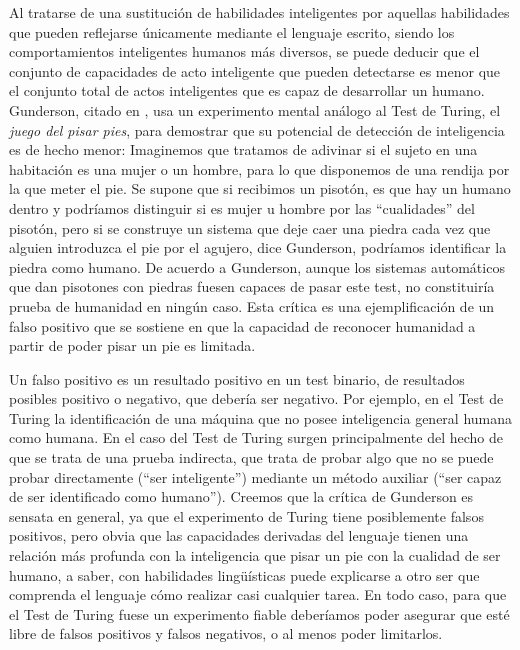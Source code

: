 \documentclass[12pt]{memoir}
\begin{document}
Al tratarse de una sustitución de habilidades inteligentes por aquellas habilidades que pueden reflejarse únicamente mediante el lenguaje escrito, siendo los comportamientos inteligentes humanos más diversos, se puede deducir que el conjunto de capacidades de acto inteligente que pueden detectarse es menor que el conjunto total de actos inteligentes que es capaz de desarrollar un humano. Gunderson, citado en \parencite[apartado 3.1]{afterTuring}, usa un experimento mental análogo al Test de Turing, el \textit{juego del pisar pies}, para demostrar que su potencial de detección de inteligencia es de hecho menor: Imaginemos que tratamos de adivinar si el sujeto en una habitación es una mujer o un hombre, para lo que disponemos de una rendija por la que meter el pie. Se supone que si recibimos un pisotón, es que hay un humano dentro y podríamos distinguir si es mujer u hombre por las ``cualidades'' del pisotón, pero si se construye un sistema que deje caer una piedra cada vez que alguien introduzca el pie por el agujero, dice Gunderson, podríamos identificar la piedra como humano. De acuerdo a Gunderson, aunque los sistemas automáticos que dan pisotones con piedras fuesen capaces de pasar este test, no constituiría prueba de humanidad en ningún caso. Esta crítica es una ejemplificación de un falso positivo que se sostiene en que la capacidad de reconocer humanidad a partir de poder pisar un pie es limitada. 

Un falso positivo es un resultado positivo en un test binario, de resultados posibles positivo o negativo, que debería ser negativo. Por ejemplo, en el Test de Turing la identificación de una máquina que no posee inteligencia general humana como humana. En el caso del Test de Turing surgen principalmente del hecho de que se trata de una prueba indirecta, que trata de probar algo que no se puede probar directamente (``ser inteligente'') mediante un método auxiliar (``ser capaz de ser identificado como humano''). Creemos que la crítica de Gunderson es sensata en general, ya que el experimento de Turing tiene posiblemente falsos positivos, pero obvia que las capacidades derivadas del lenguaje tienen una relación más profunda con la inteligencia que pisar un pie con la cualidad de ser humano, a saber, con habilidades lingüísticas puede explicarse a otro ser que comprenda el lenguaje cómo realizar casi cualquier tarea. En todo caso, para que el Test de Turing fuese un experimento fiable deberíamos poder asegurar que esté libre de falsos positivos y falsos negativos, o al menos poder limitarlos.
\end{document}
